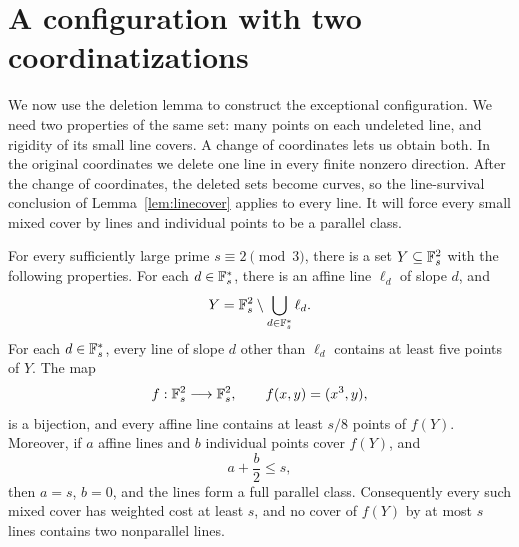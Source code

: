 \section{A configuration with two coordinatizations}
\label{sec:gadget}

We now use the deletion lemma to construct the exceptional configuration.
We need two properties of the same set: many points on each undeleted
line, and rigidity of its small line covers.  A change of coordinates
lets us obtain both.  In the original coordinates we delete one line
in every finite nonzero direction.  After the change of coordinates,
the deleted sets become curves, so the line-survival conclusion of
Lemma~\ref{lem:linecover} applies to every line.  It will force every
small mixed cover by lines and individual points to be a parallel class.

\begin{lemma}
\label{lem:gadget}
For every sufficiently large prime \(s\equiv2\pmod3\), there is
a set \(Y\subseteq\mathbb F_s^2\) with the following properties.  For each
\(d\in\mathbb F_s^*\), there is an affine line \(\ell_d\) of slope \(d\),
and
\[
 Y=\mathbb F_s^2\setminus\bigcup_{d\in\mathbb F_s^*}\ell_d.
\]
For each \(d\in\mathbb F_s^*\), every line of slope \(d\) other than
\(\ell_d\) contains at least five points of \(Y\).  The map
\[
 f:\mathbb F_s^2\longrightarrow\mathbb F_s^2,
 \qquad f(x,y)=(x^3,y),
\]
is a bijection, and every affine line contains at least \(s/8\) points
of \(f(Y)\).  Moreover, if \(a\) affine lines and \(b\) individual
points cover \(f(Y)\), and
\begin{equation}
\label{con-weighted-budget}
 a+\frac b2\le s,
\end{equation}
then \(a=s\), \(b=0\), and the lines form a full parallel class.
Consequently every such mixed cover has weighted cost at least \(s\),
and no cover of \(f(Y)\) by at most \(s\) lines contains two
nonparallel lines.
\end{lemma}

